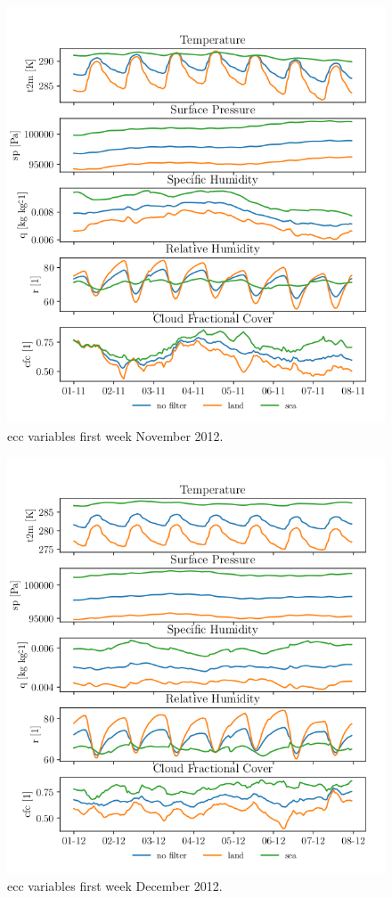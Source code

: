 \begin{figure}[ht]
    \centering
    \includegraphics{python_figs/spatially_averaged_one_week_from_2012-11-01.png}
    \caption{\acrshort{ecc} variables first week November 2012.}
    \label{fig:nov12}
\end{figure}
\begin{figure}[ht]
    \centering
    \includegraphics{python_figs/spatially_averaged_one_week_from_2012-12-01.png}
    \caption{\acrshort{ecc} variables first week December 2012.}
    \label{fig:dec12}
\end{figure}

